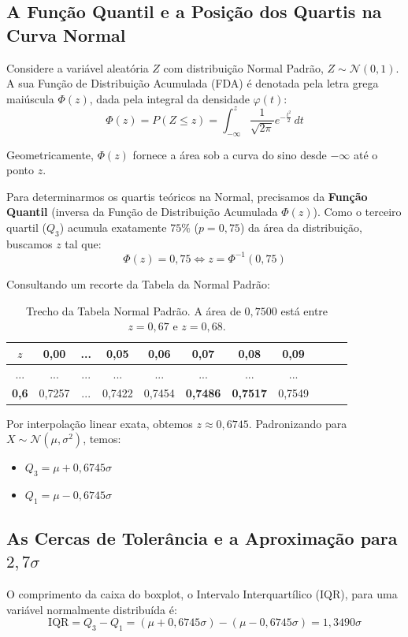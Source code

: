 \documentclass[12pt,a4paper]{article}
\begin{document}
\subsection{A Função Quantil e a Posição dos Quartis na Curva Normal}
Considere a variável aleatória $Z$ com distribuição Normal Padrão, $Z \sim \mathcal{N}(0, 1)$. A sua Função de Distribuição Acumulada (FDA) é denotada pela letra grega maiúscula $\Phi(z)$, dada pela integral da densidade $\varphi(t)$:
\begin{equation}
\Phi(z) = P(Z \le z) = \int_{-\infty}^{z} \frac{1}{\sqrt{2\pi}} e^{-\frac{t^2}{2}} \, dt
\end{equation}

Geometricamente, $\Phi(z)$ fornece a área sob a curva do sino desde $-\infty$ até o ponto $z$.

Para determinarmos os quartis teóricos na Normal, precisamos da \textbf{Função Quantil} (inversa da Função de Distribuição Acumulada $\Phi(z)$). Como o terceiro quartil ($Q_3$) acumula exatamente $75\%$ ($p = 0,75$) da área da distribuição, buscamos $z$ tal que:
\begin{equation}
\Phi(z) = 0,75 \iff z = \Phi^{-1}(0,75)
\end{equation}

Consultando um recorte da Tabela da Normal Padrão:
\begin{table}[H]
\centering
\begin{tabular}{@{}c|cccccccccc@{}}
\toprule
$z$ & 0,00 & ... & 0,05 & 0,06 & \textbf{0,07} & \textbf{0,08} & 0,09 \\ \midrule
... & ... & ... & ... & ... & ... & ... & ... \\
\textbf{0,6} & 0,7257 & ... & 0,7422 & 0,7454 & \textbf{0,7486} & \textbf{0,7517} & 0,7549 \\
\bottomrule
\end{tabular}
\caption{Trecho da Tabela Normal Padrão. A área de $0,7500$ está entre $z=0,67$ e $z=0,68$.}
\end{table}

Por interpolação linear exata, obtemos $z \approx 0,6745$. Padronizando para $X \sim \mathcal{N}(\mu, \sigma^2)$, temos:
\begin{itemize}
    \item $Q_3 = \mu + 0,6745\sigma$
    \item $Q_1 = \mu - 0,6745\sigma$
\end{itemize}

\subsection{As Cercas de Tolerância e a Aproximação para $2,7\sigma$}
O comprimento da caixa do boxplot, o Intervalo Interquartílico (IQR), para uma variável normalmente distribuída é:
\begin{equation}
\text{IQR} = Q_3 - Q_1 = (\mu + 0,6745\sigma) - (\mu - 0,6745\sigma) = 1,3490\sigma
\end{equation}
\end{document}
